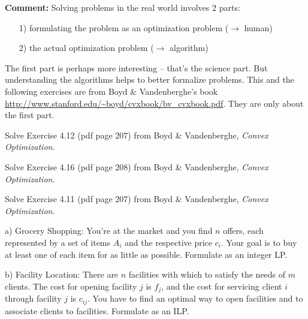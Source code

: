 

\textbf{Comment:} Solving problems in the real world involves 2 parts:
\begin{enumerate}
\item[1)] formulating the problem as an optimization problem ($\to$ human)
\item[2)] the actual optimization problem ($\to$ algorithm)
\end{enumerate}
The first part is perhaps more interesting -- that's the science
part. But understanding the algorithms helps to better formalize
problems. This and the following exercises are from Boyd \&
Vandenberghe's book
\url{http://www.stanford.edu/~boyd/cvxbook/bv_cvxbook.pdf}. They are only about the first part.


Solve Exercise 4.12 (pdf page 207) from  Boyd \& Vandenberghe,
\emph{Convex Optimization.}



Solve Exercise 4.16 (pdf page 208) from  Boyd \& Vandenberghe,
\emph{Convex Optimization.}



Solve Exercise 4.11 (pdf page 207) from  Boyd \& Vandenberghe,
\emph{Convex Optimization.}



a) Grocery Shopping: You're at the market and you find $n$ offers,
each represented by a set of items $A_i$ and the respective price
$c_i$. Your goal is to buy at least one of each item for as little as
possible. Formulate as an integer LP.

b) Facility Location: There are $n$ facilities with which to satisfy the needs of $m$ clients.  The
cost for opening facility $j$ is $f_j$, and the cost for servicing client $i$
through facility $j$ is $c_{ij}$.  You have to find an optimal way to open
facilities and to associate clients to facilities. Formulate as an ILP.

